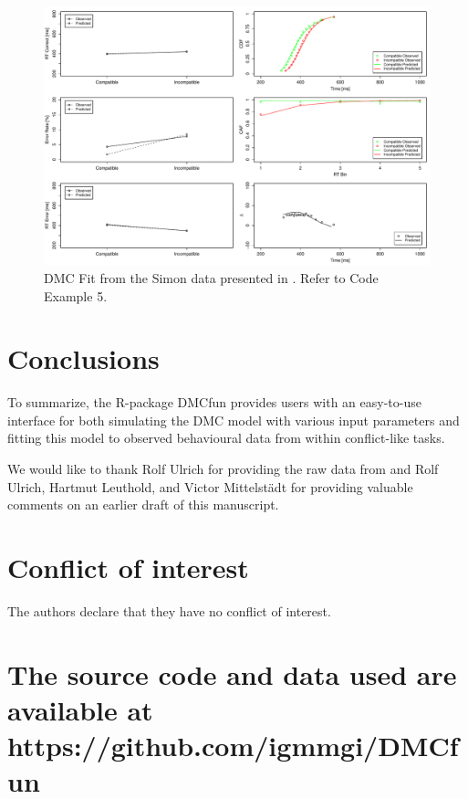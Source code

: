 \begin{figure}[H]
    \includegraphics[width=1\textwidth]{../figures/figure6.pdf}
    \caption{DMC Fit from the Simon data presented in \textcite{ulrich2015automatic}. Refer to Code Example 5.}
    \label{fig:6}
\end{figure}

\section{Conclusions}
\label{summary}
To summarize, the R-package DMCfun provides users with an easy-to-use interface
for both simulating the DMC model with various input parameters and fitting
this model to observed behavioural data from within conflict-like tasks. 

\begin{acknowledgements}
    We would like to thank Rolf Ulrich for providing the raw data from
    \textcite{ulrich2015automatic} and Rolf Ulrich, Hartmut Leuthold, and Victor
    Mittelstädt for providing valuable comments on an earlier draft of this
    manuscript.
\end{acknowledgements}

\section*{Conflict of interest}
The authors declare that they have no conflict of interest.

\section*{The source code and data used are available at https://github.com/igmmgi/DMCfun}

\printbibliography

